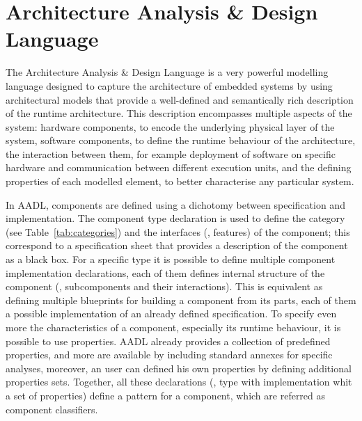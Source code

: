 \minitoc
\newpage

\section{Architecture Analysis \& Design Language}
The Architecture Analysis \& Design Language is a very powerful modelling language designed to capture the architecture of embedded systems by using architectural models that provide a well-defined and semantically rich description of the runtime architecture. This description encompasses multiple aspects of the system: hardware components, to encode the underlying physical layer of the system, software components, to define the runtime behaviour of the architecture, the interaction between them, for example deployment of software on specific hardware and communication between different execution units, and the defining properties of each modelled element, to better characterise any particular system.

 In AADL, components are defined using a dichotomy between specification and implementation. The component type declaration is used to define the category (see Table~\ref{tab:categories}) and the interfaces (\ie, features) of the component; this correspond to a specification sheet that provides a description of the component as a black box. For a specific type it is possible to define multiple component implementation declarations, each of them defines internal structure of the component (\ie, subcomponents and their interactions). This is equivalent as defining multiple blueprints for building a component from its parts, each of them a possible implementation of an already defined specification. To specify even more the characteristics of a component, especially its runtime behaviour, it is possible to use properties. AADL already provides a collection of predefined properties, and more are available by including standard annexes for specific analyses, moreover, an user can defined his own properties by defining additional properties sets. Together, all these declarations (\ie, type with implementation whit a set of properties) define a pattern for a component, which are referred as component classifiers.
 
